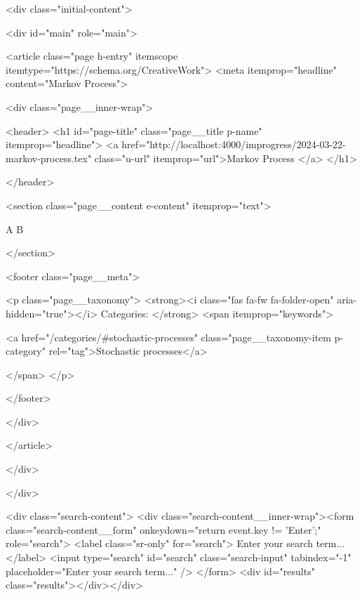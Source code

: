     <div class="initial-content">
      





<div id="main" role="main">
  


  <article class="page h-entry" itemscope itemtype="https://schema.org/CreativeWork">
    <meta itemprop="headline" content="Markov Process">
    
    
    

    <div class="page__inner-wrap">
      
        <header>
          <h1 id="page-title" class="page__title p-name" itemprop="headline">
            <a href="http://localhost:4000/improgress/2024-03-22-markov-process.tex" class="u-url" itemprop="url">Markov Process
</a>
          </h1>
          


        </header>
      

      <section class="page__content e-content" itemprop="text">
        
        A \cup B
        
      </section>

      <footer class="page__meta">
        
        


  


  

  <p class="page__taxonomy">
    <strong><i class="fas fa-fw fa-folder-open" aria-hidden="true"></i> Categories: </strong>
    <span itemprop="keywords">
    
      <a href="/categories/#stochastic-processes" class="page__taxonomy-item p-category" rel="tag">Stochastic processes</a>
    
    </span>
  </p>


        

      </footer>

      

      
    </div>

    
  </article>

  
  
</div>

    </div>

    
      <div class="search-content">
        <div class="search-content__inner-wrap"><form class="search-content__form" onkeydown="return event.key != 'Enter';" role="search">
    <label class="sr-only" for="search">
      Enter your search term...
    </label>
    <input type="search" id="search" class="search-input" tabindex="-1" placeholder="Enter your search term..." />
  </form>
  <div id="results" class="results"></div></div>

